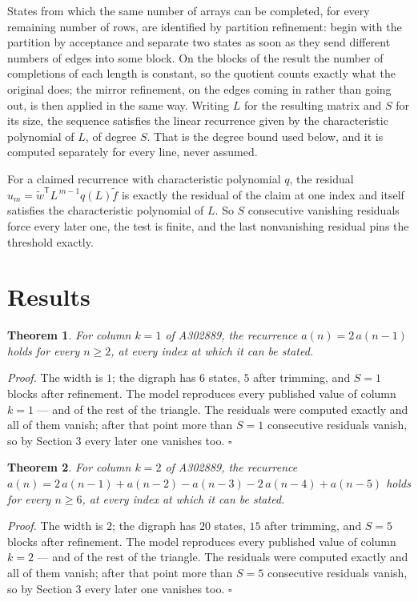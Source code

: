 \documentclass[11pt]{article}
\newtheorem{theorem}{Theorem}
\theoremstyle{definition}
\begin{document}
States from which the same number of arrays can be completed, for every remaining number of rows, are identified by partition refinement: begin with the partition by acceptance and separate two states as soon as they send different numbers of edges into some block. On the blocks of the result the number of completions of each length is constant, so the quotient counts exactly what the original does; the mirror refinement, on the edges coming in rather than going out, is then applied in the same way. Writing $L$ for the resulting matrix and $S$ for its size, the sequence satisfies the linear recurrence given by the characteristic polynomial of $L$, of degree $S$. That is the degree bound used below, and it is computed separately for every line, never assumed.

For a claimed recurrence with characteristic polynomial $q$, the residual $u_m = \tilde w^{\mathsf T}L^{\,m-1}q(L)\tilde f$ is exactly the residual of the claim at one index and itself satisfies the characteristic polynomial of $L$. So $S$ consecutive vanishing residuals force every later one, the test is finite, and the last nonvanishing residual pins the threshold exactly.

\section{Results}

\begin{theorem} For column $k = 1$ of A302889, the recurrence $a(n) = 2\,a(n-1)$ holds for every $n \ge 2$, at every index at which it can be stated.\end{theorem}

{\itshape Proof.} The width is $1$; the digraph has $6$ states, $5$ after trimming, and $S = 1$ blocks after refinement. The model reproduces every published value of column $k = 1$ --- and of the rest of the triangle. The residuals were computed exactly and all of them vanish; after that point more than $S = 1$ consecutive residuals vanish, so by Section 3 every later one vanishes too. $\square$

\begin{theorem} For column $k = 2$ of A302889, the recurrence $a(n) = 2\,a(n-1) + a(n-2) - a(n-3) - 2\,a(n-4) + a(n-5)$ holds for every $n \ge 6$, at every index at which it can be stated.\end{theorem}

{\itshape Proof.} The width is $2$; the digraph has $20$ states, $15$ after trimming, and $S = 5$ blocks after refinement. The model reproduces every published value of column $k = 2$ --- and of the rest of the triangle. The residuals were computed exactly and all of them vanish; after that point more than $S = 5$ consecutive residuals vanish, so by Section 3 every later one vanishes too. $\square$
\end{document}
